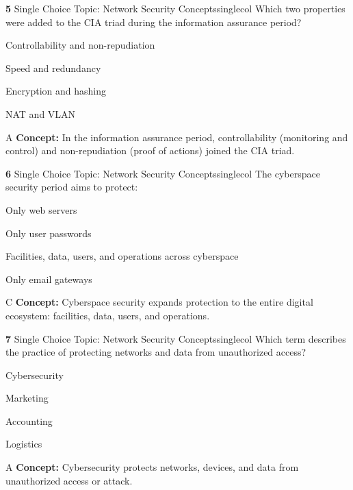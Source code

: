 \documentclass[10pt,a4paper]{article}
\begin{document}
\begin{qcard}{\color{white}\textbf{5} \hfill \small Single Choice \textbar{} Topic: Network Security Concepts}{singlecol}
Which two properties were added to the CIA triad during the information assurance period?

\begin{qoptions}
\item Controllability and non-repudiation
\item Speed and redundancy
\item Encryption and hashing
\item NAT and VLAN
\end{qoptions}
\begin{explainbox}{A}
\textbf{Concept:} In the information assurance period, controllability (monitoring and control) and non-repudiation (proof of actions) joined the CIA triad.
\end{explainbox}
\end{qcard}

\begin{qcard}{\color{white}\textbf{6} \hfill \small Single Choice \textbar{} Topic: Network Security Concepts}{singlecol}
The cyberspace security period aims to protect:

\begin{qoptions}
\item Only web servers
\item Only user passwords
\item Facilities, data, users, and operations across cyberspace
\item Only email gateways
\end{qoptions}
\begin{explainbox}{C}
\textbf{Concept:} Cyberspace security expands protection to the entire digital ecosystem: facilities, data, users, and operations.
\end{explainbox}
\end{qcard}

\begin{qcard}{\color{white}\textbf{7} \hfill \small Single Choice \textbar{} Topic: Network Security Concepts}{singlecol}
Which term describes the practice of protecting networks and data from unauthorized access?

\begin{qoptions}
\item Cybersecurity
\item Marketing
\item Accounting
\item Logistics
\end{qoptions}
\begin{explainbox}{A}
\textbf{Concept:} Cybersecurity protects networks, devices, and data from unauthorized access or attack.
\end{explainbox}
\end{qcard}
\end{document}
